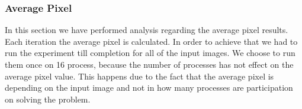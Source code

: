 \documentclass[12pt,a4paper]{article}
\begin{document}
        \subsubsection{Average Pixel}

        	In this section we have performed analysis regarding the average pixel results. Each iteration the average pixel is calculated. In order to achieve that we had to run the experiment till completion for all of the input images. We choose to run them once on 16 process, because the number of processes has not effect on the average pixel value. This happens due to the fact that the average pixel is depending on the input image and not in how many processes are participation on solving the problem.

        	\begin{figure}[ht]
    			  \centering
  			    \qquad
  			    \qquad

\end{figure}
\end{document}
